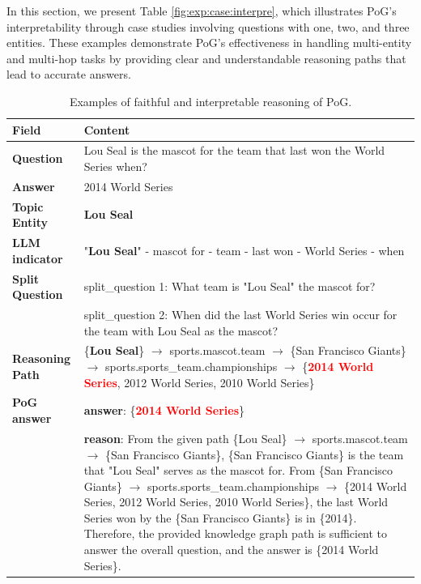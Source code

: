 In this section, we present Table \ref{fig:exp:case:interpre}, which illustrates PoG's interpretability through case studies involving questions with one, two, and three entities. These examples demonstrate PoG's effectiveness in handling multi-entity and multi-hop tasks by providing clear and understandable reasoning paths that lead to accurate answers.

\begin{table}[]
\centering
\vspace{4mm}
\caption{Examples of faithful and interpretable reasoning of PoG.} \label{fig:exp:case:interpre}
% 
\label{tab:case_int}
\begin{tabularx}{0.9\textwidth}{@{}p{3cm}X@{}} 
\toprule
\textbf{Field} & \textbf{Content} \\ 
\midrule
\textbf{Question} & Lou Seal is the mascot for the team that last won the World Series when? \\ 
\textbf{Answer} & 2014 World Series \\
\textbf{Topic Entity} & \textbf{Lou Seal} \\
\toprule
\textbf{LLM indicator} & "\textbf{Lou Seal}" - mascot for - team - last won - World Series - when \\
\textbf{Split Question} & split\_question 1: What team is "Lou Seal" the mascot for? \\

& split\_question 2: When did the last World Series win occur for the team with Lou Seal as the mascot?\\
\toprule
\textbf{Reasoning Path} & \{\textbf{Lou Seal}\} $\rightarrow$ sports.mascot.team $\rightarrow$ \{San Francisco Giants\} $\rightarrow$ sports.sports\_team.championships $\rightarrow$ \{\textcolor{red}{\textbf{2014 World Series}}, 2012 World Series, 2010 World Series\} \\
\toprule
\textbf{PoG answer} & 
\textbf{answer}: \{\textcolor{red}{\textbf{2014 World Series}}\} \\

 & \textbf{reason}: From the given path \{Lou Seal\} $\rightarrow$ sports.mascot.team $\rightarrow$ \{San Francisco Giants\}, \{San Francisco Giants\} is the team that "Lou Seal" serves as the mascot for. From \{San Francisco Giants\} $\rightarrow$ sports.sports\_team.championships $\rightarrow$ \{2014 World Series, 2012 World Series, 2010 World Series\}, the last World Series won by the \{San Francisco Giants\} is in \{2014\}. Therefore, the provided knowledge graph path is sufficient to answer the overall question, and the answer is \{2014 World Series\}.\\
\bottomrule



\end{tabularx}
\end{table}
